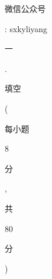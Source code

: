 \documentclass[10pt]{article}
\begin{document}
\begin{CJK}{UTF8}{mj}微信公众号\end{CJK}: sxkyliyang

\begin{CJK}{UTF8}{mj}一\end{CJK}. \begin{CJK}{UTF8}{mj}填空\end{CJK}(\begin{CJK}{UTF8}{mj}每小题\end{CJK} 8 \begin{CJK}{UTF8}{mj}分\end{CJK}, \begin{CJK}{UTF8}{mj}共\end{CJK} 80 \begin{CJK}{UTF8}{mj}分\end{CJK})
\end{document}
